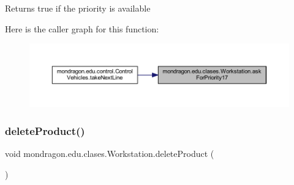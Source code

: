 \begin{DoxyReturn}{Returns}
true if the priority is available 
\end{DoxyReturn}
Here is the caller graph for this function\+:\nopagebreak
\begin{figure}[H]
\begin{center}
\leavevmode
\includegraphics[width=350pt]{classmondragon_1_1edu_1_1clases_1_1_workstation_a49feeeb5cefa0f0e49792170d8821c51_icgraph}
\end{center}
\end{figure}
\mbox{\label{classmondragon_1_1edu_1_1clases_1_1_workstation_a00808df804a59149feaa317c146bb5d7}} 
\subsubsection{\texorpdfstring{deleteProduct()}{deleteProduct()}}
{\footnotesize\ttfamily void mondragon.\+edu.\+clases.\+Workstation.\+delete\+Product (\begin{DoxyParamCaption}{ }\end{DoxyParamCaption})\hspace{0.3cm}{\ttfamily [inline]}}

